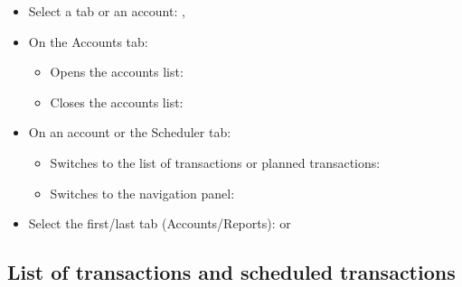 \begin{itemize}
	\item Select a tab or an account: \keys{\arrowkeyup}, \keys{\arrowkeydown}%
	\item On the Accounts tab:%
	\begin{itemize}
		\item Opens the accounts list: \keys{\arrowkeyright}%
		\item Closes the accounts list: \keys{\arrowkeyleft}%
	\end{itemize}
	\item On an account or the Scheduler tab:%
	\begin{itemize}
		\item Switches to the list of transactions or planned transactions: \keys{\arrowkeyright}%
		\item Switches to the navigation panel: \keys{\arrowkeyleft}%
	\end{itemize}
	\item Select the first/last tab (Accounts/Reports):  or %
\end{itemize}


\subsection{List of transactions and scheduled transactions}%

